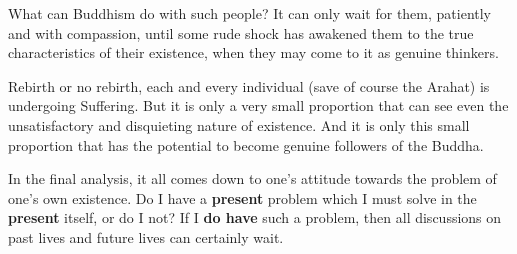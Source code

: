 What can Buddhism do with such people? It can only wait for them, patiently and with compassion, until some rude shock has awakened them to the true characteristics of their existence, when they may come to it as genuine thinkers.

Rebirth or no rebirth, each and every individual (save of course the Arahat) is undergoing Suffering. But it is only a very small proportion that can see even the unsatisfactory and disquieting nature of existence. And it is only this small proportion that has the potential to become genuine followers of the Buddha.

In the final analysis, it all comes down to one's attitude towards the problem of one's own existence. Do I have a \textbf{present} problem which I must solve in the \textbf{present} itself, or do I not? If I \textbf{do have} such a problem, then all discussions on past lives and future lives can certainly wait.
